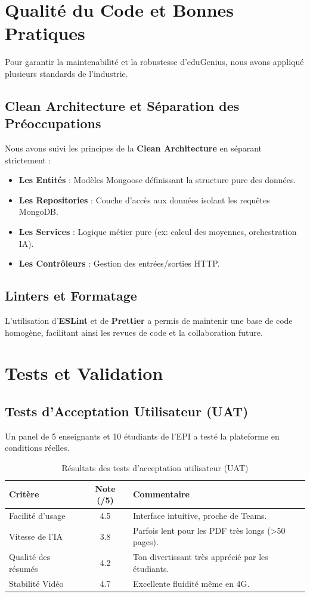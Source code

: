 \section{Qualité du Code et Bonnes Pratiques}
Pour garantir la maintenabilité et la robustesse d'eduGenius, nous avons appliqué plusieurs standards de l'industrie.

\subsection{Clean Architecture et Séparation des Préoccupations}
Nous avons suivi les principes de la \textbf{Clean Architecture} en séparant strictement :
\begin{itemize}
    \item \textbf{Les Entités} : Modèles Mongoose définissant la structure pure des données.
    \item \textbf{Les Repositories} : Couche d'accès aux données isolant les requêtes MongoDB.
    \item \textbf{Les Services} : Logique métier pure (ex: calcul des moyennes, orchestration IA).
    \item \textbf{Les Contrôleurs} : Gestion des entrées/sorties HTTP.
\end{itemize}

\subsection{Linters et Formatage}
L'utilisation d'\textbf{ESLint} et de \textbf{Prettier} a permis de maintenir une base de code homogène, facilitant ainsi les revues de code et la collaboration future.

\section{Tests et Validation}
\subsection{Tests d'Acceptation Utilisateur (UAT)}
Un panel de 5 enseignants et 10 étudiants de l'EPI a testé la plateforme en conditions réelles.

\begin{table}[H]
\centering
\begin{tabular}{|l|c|p{8cm}|}
\hline
\textbf{Critère} & \textbf{Note (/5)} & \textbf{Commentaire} \\ \hline
Facilité d'usage & 4.5 & Interface intuitive, proche de Teams. \\ \hline
Vitesse de l'IA & 3.8 & Parfois lent pour les PDF très longs (>50 pages). \\ \hline
Qualité des résumés & 4.2 & Ton divertissant très apprécié par les étudiants. \\ \hline
Stabilité Vidéo & 4.7 & Excellente fluidité même en 4G. \\ \hline
\end{tabular}
\caption{Résultats des tests d'acceptation utilisateur (UAT)}
\end{table}

